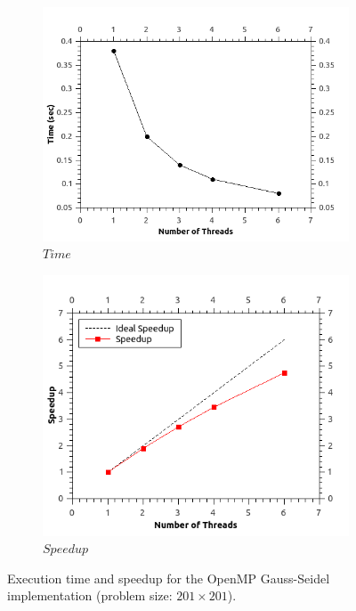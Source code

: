 \documentclass[11pt]{report}
\begin{document}
\begin{figure}[th!]
\centering
\begin{subfigure}{0.45\textwidth}
  \centering
  \includegraphics[width=1.0\linewidth]{images/sor_time_201}
  \caption{$Time$}
\end{subfigure}
\begin{subfigure}{0.45\textwidth}
  \centering
  \includegraphics[width=1.0\linewidth]{images/sor_speedup_201}
  \caption{$Speedup$}
\end{subfigure}
\caption{Execution time and speedup for the OpenMP Gauss-Seidel implementation (problem size: $201 \times 201$). }
\label{fig:example5.7}
\end{figure}
\end{document}
